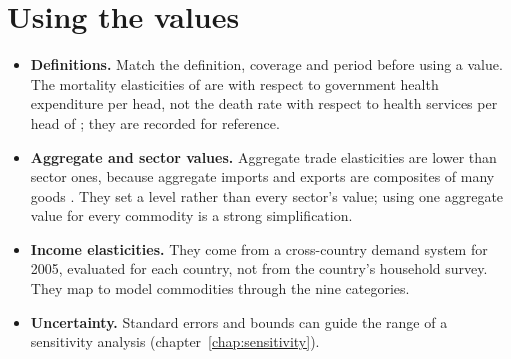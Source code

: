 \section{Using the values}

\begin{itemize}
\item \textbf{Definitions.} Match the definition, coverage and period before
using a value. The mortality elasticities of \citet{bokhari2007} are with
respect to government health expenditure per head, not the death rate with
respect to health services per head of ; they are
recorded for reference.
\item \textbf{Aggregate and sector values.} Aggregate trade elasticities are
lower than sector ones, because aggregate imports and exports are composites of
many goods \citep{devarajan2023}. They set a level rather than every sector's
value; using one aggregate value for every commodity is a strong
simplification.
\item \textbf{Income elasticities.} They come from a cross-country demand
system for 2005, evaluated for each country, not from the country's household
survey. They map to model commodities through the nine categories.
\item \textbf{Uncertainty.} Standard errors and bounds can guide the range of
a sensitivity analysis (chapter~\ref{chap:sensitivity}).
\end{itemize}
